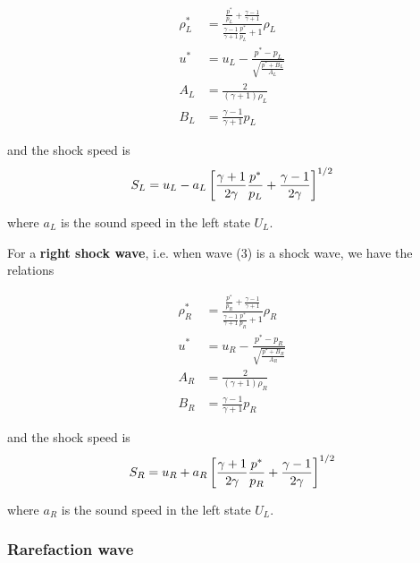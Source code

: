 \begin{align*}
	\rho^*_L &= 
		\frac{\frac{p^*}{p_L} + \frac{\gamma - 1}{\gamma+1}}{\frac{\gamma - 1}{\gamma+1} \frac{p^*}{p_L} + 1} \rho_L \\
	u^* &= 
		u_L - \frac{p^* - p_L}{\sqrt{\frac{p^* + B_L}{A_L}}}\\
	A_L &= 
		\frac{2}{(\gamma + 1) \rho_L}\\
	B_L &= 
		\frac{\gamma - 1}{\gamma + 1} p_L
\end{align*}

and the shock speed is
\begin{align*}
	S_L = u_L - a_L \left[\frac{\gamma + 1}{2 \gamma} \frac{p^*}{p_L} + \frac{\gamma - 1}{2\gamma} \right]^{1/2}
\end{align*}

where $a_L$ is the sound speed in the left state $U_L$.



For a \textbf{right shock wave}, i.e. when wave (3) is a shock wave, we have the relations


\begin{align*}
	\rho^*_R &= 
		\frac{\frac{p^*}{p_R} + \frac{\gamma - 1}{\gamma+1}}{\frac{\gamma - 1}{\gamma+1} \frac{p^*}{p_R} + 1} \rho_R \\
	u^* &= 
		u_R - \frac{p^* - p_R}{\sqrt{\frac{p^* + B_R}{A_R}}}\\
	A_R &= 
		\frac{2}{(\gamma + 1) \rho_R}\\
	B_R &= 
		\frac{\gamma - 1}{\gamma + 1} p_R
\end{align*}

and the shock speed is
\begin{align*}
	S_R = u_R + a_R \left[\frac{\gamma + 1}{2 \gamma} \frac{p^*}{p_R} + \frac{\gamma - 1}{2\gamma} \right]^{1/2}
\end{align*}

where $a_R$ is the sound speed in the left state $U_L$.










\subsubsection{Rarefaction wave}

